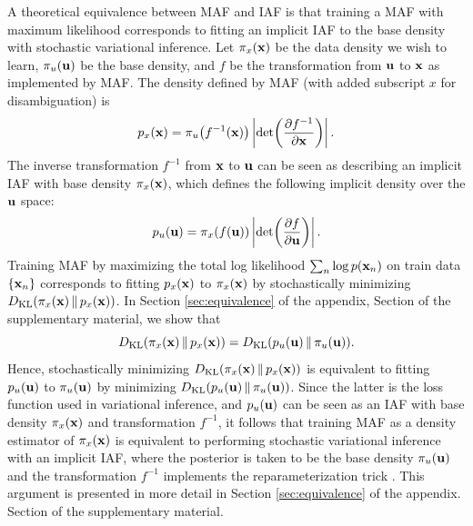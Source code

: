 A theoretical equivalence between MAF and IAF is that training a MAF with maximum likelihood corresponds to fitting an implicit IAF to the base density with stochastic variational inference. Let $\pi_x\br{\vect{x}}$ be the data density we wish to learn, $\pi_u\br{\vect{u}}$ be the base density, and $f$ be the transformation from $\vect{u}$ to $\vect{x}$ as implemented by MAF\@. The density defined by MAF (with added subscript $x$ for disambiguation) is
\begin{equation}
p_x\br{\vect{x}} = \pi_u\br{f^{-1}\br{\vect{x}}}\abs{\det\br{\deriv{f^{-1}}{\vect{x}}}}.
\end{equation}
The inverse transformation $f^{-1}$ from $\vect{x}$ to $\vect{u}$ can be seen as describing an implicit IAF with base density $\pi_x\br{\vect{x}}$, which defines the following implicit density over the $\vect{u}$ space:
\begin{equation}
p_u\br{\vect{u}} = \pi_x\br{f\br{\vect{u}}}\abs{\det\br{\deriv{f}{\vect{u}}}}.
\end{equation}
Training MAF by maximizing the total log likelihood $\sum_n{\log{\prob{\vect{x}_n}}}$ on train data $\set{\vect{x}_n}$ corresponds to fitting $p_x\br{\vect{x}}$ to $\pi_x\br{\vect{x}}$ by stochastically minimizing $\kl{\pi_x\br{\vect{x}}}{p_x\br{\vect{x}}}$. In
\ifarxiv
Section \ref{sec:equivalence} of the appendix,
\else
Section  of the supplementary material,
\fi
we show that 
\begin{equation}
\kl{\pi_x\br{\vect{x}}}{p_x\br{\vect{x}}} = \kl{p_u\br{\vect{u}}}{\pi_u\br{\vect{u}}}. 
\end{equation}
Hence, stochastically minimizing $\kl{\pi_x\br{\vect{x}}}{p_x\br{\vect{x}}}$ is equivalent to fitting $p_u\br{\vect{u}}$ to $\pi_u\br{\vect{u}}$ by minimizing $\kl{p_u\br{\vect{u}}}{\pi_u\br{\vect{u}}}$. Since the latter is the loss function used in variational inference, and $p_u\br{\vect{u}}$ can be seen as an IAF with base density $\pi_x\br{\vect{x}}$ and transformation $f^{-1}$, it follows that training MAF as a density estimator of $\pi_x\br{\vect{x}}$ is equivalent to performing stochastic variational inference with an implicit IAF, where the posterior is taken to be the base density $\pi_u\br{\vect{u}}$ and the transformation $f^{-1}$ implements the reparameterization trick \citep{Kingma:2014, Rezende:2014}. This argument is presented in more detail in 
\ifarxiv
Section \ref{sec:equivalence} of the appendix.
\else
Section  of the supplementary material.
\fi


